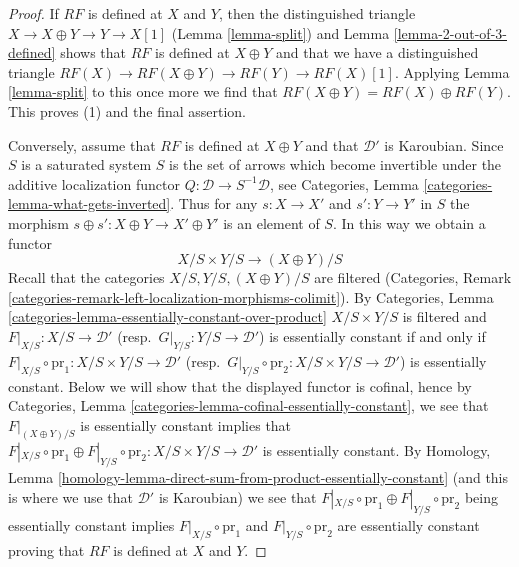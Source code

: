 \begin{proof}
If $RF$ is defined at $X$ and $Y$, then the distinguished triangle
$X \to X \oplus Y \to Y \to X[1]$ (Lemma \ref{lemma-split}) and
Lemma \ref{lemma-2-out-of-3-defined}
shows that $RF$ is defined at $X \oplus Y$ and that we
have a distinguished triangle
$RF(X) \to RF(X \oplus Y) \to RF(Y) \to RF(X)[1]$.
Applying Lemma \ref{lemma-split} to this once more we find
that $RF(X \oplus Y) = RF(X) \oplus RF(Y)$.
This proves (1) and the final assertion.

\medskip\noindent
Conversely, assume that $RF$ is defined at $X \oplus Y$ and that $\mathcal{D}'$
is Karoubian. Since $S$ is a saturated system $S$ is the set of arrows which
become invertible under the additive localization functor
$Q : \mathcal{D} \to S^{-1}\mathcal{D}$, see
Categories, Lemma \ref{categories-lemma-what-gets-inverted}.
Thus for any $s : X \to X'$ and $s' : Y \to Y'$ in $S$ the morphism
$s \oplus s' : X \oplus Y \to X' \oplus Y'$ is an element of $S$.
In this way we obtain a functor
$$
X/S \times Y/S \longrightarrow (X \oplus Y)/S
$$
Recall that the categories $X/S, Y/S, (X \oplus Y)/S$ are filtered
(Categories, Remark
\ref{categories-remark-left-localization-morphisms-colimit}).
By Categories, Lemma \ref{categories-lemma-essentially-constant-over-product}
$X/S \times Y/S$ is filtered and
$F|_{X/S} : X/S \to \mathcal{D}'$ (resp.\ $G|_{Y/S} : Y/S \to \mathcal{D}'$)
is essentially constant if and only if
$F|_{X/S} \circ \text{pr}_1 : X/S \times Y/S \to \mathcal{D}'$
(resp.\ $G|_{Y/S} \circ \text{pr}_2 : X/S \times Y/S \to \mathcal{D}'$)
is essentially constant. Below we will show that the displayed functor
is cofinal, hence by
Categories, Lemma \ref{categories-lemma-cofinal-essentially-constant},
we see that $F|_{(X \oplus Y)/S}$ is essentially constant implies that
$F|_{X/S} \circ \text{pr}_1 \oplus F|_{Y/S} \circ \text{pr}_2 :
X/S \times Y/S \to \mathcal{D}'$
is essentially constant. By Homology, Lemma
\ref{homology-lemma-direct-sum-from-product-essentially-constant}
(and this is where we use that $\mathcal{D}'$ is Karoubian)
we see that 
$F|_{X/S} \circ \text{pr}_1 \oplus F|_{Y/S} \circ \text{pr}_2$
being essentially constant implies
$F|_{X/S} \circ \text{pr}_1$ and
$F|_{Y/S} \circ \text{pr}_2$ are essentially constant proving that $RF$ is
defined at $X$ and $Y$.


\end{proof}
